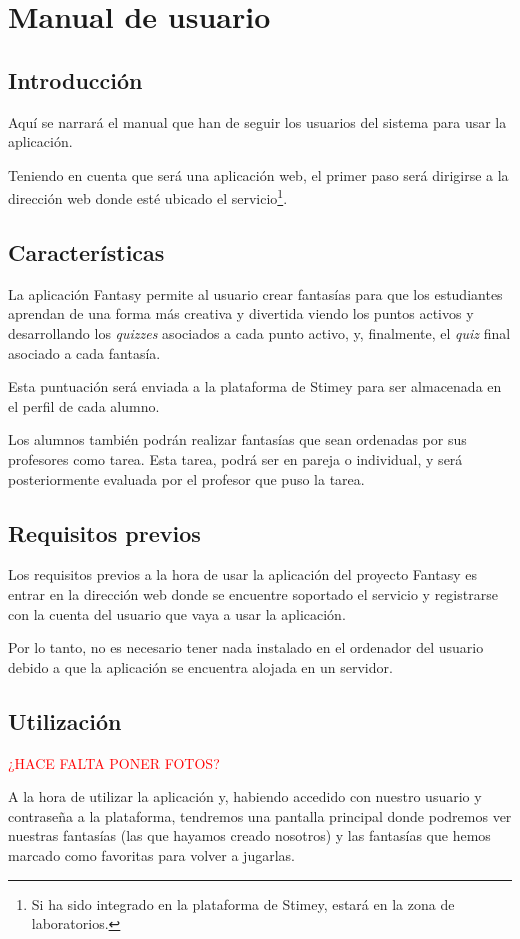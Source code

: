 \chapter{Manual de usuario}
\section{Introducción}
Aquí se narrará el manual que han de seguir los usuarios del sistema para usar la aplicación.

Teniendo en cuenta que será una aplicación web, el primer paso será dirigirse a la dirección web donde esté ubicado el servicio\footnote{Si ha sido integrado en la plataforma de Stimey, estará en la zona de laboratorios.}.

\section{Características}
La aplicación Fantasy permite al usuario crear fantasías para que los estudiantes aprendan de una forma más creativa y divertida viendo los puntos activos y desarrollando los \textit{quizzes} asociados a cada punto activo, y, finalmente, el \textit{quiz} final asociado a cada fantasía.

Esta puntuación será enviada a la plataforma de Stimey para ser almacenada en el perfil de cada alumno.

Los alumnos también podrán realizar fantasías que sean ordenadas por sus profesores como tarea. Esta tarea, podrá ser en pareja o individual, y será posteriormente evaluada por el profesor que puso la tarea.

\section{Requisitos previos}
Los requisitos previos a la hora de usar la aplicación del proyecto Fantasy es entrar en la dirección web donde se encuentre soportado el servicio y registrarse con la cuenta del usuario que vaya a usar la aplicación.

Por lo tanto, no es necesario tener nada instalado en el ordenador del usuario debido a que la aplicación se encuentra alojada en un servidor.

\section{Utilización}
\textcolor{red}{¿HACE FALTA PONER FOTOS?}

A la hora de utilizar la aplicación y, habiendo accedido con nuestro usuario y contraseña a la plataforma, tendremos una pantalla principal donde podremos ver nuestras fantasías (las que hayamos creado nosotros) y las fantasías que hemos marcado como favoritas para volver a jugarlas.

